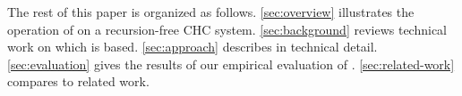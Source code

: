 The rest of this paper is organized as follows.
%
\autoref{sec:overview} illustrates the operation of \sys on a
recursion-free CHC system.
%
\autoref{sec:background} reviews technical work on which \sys is
based.
%
\autoref{sec:approach} describes \sys in technical detail.
%
\autoref{sec:evaluation} gives the results of our empirical evaluation
of \sys.
%
\autoref{sec:related-work} compares \sys to related work.
